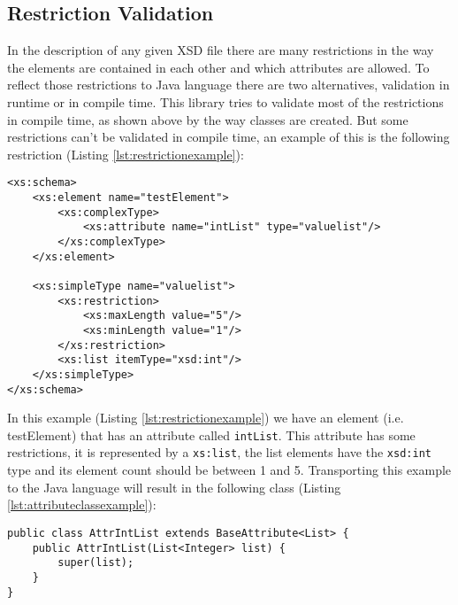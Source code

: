 \subsection{Restriction Validation}
\label{sec:restrictionvalidation}

In the description of any given \ac{XSD} file there are many restrictions in the way the elements are contained in each other and which attributes are allowed. To reflect those restrictions to Java language there are two alternatives, validation in runtime or in compile time. This library tries to validate most of the restrictions in compile time, as shown above by the way classes are created. But some restrictions can't be validated in compile time, an example of this is the following restriction (Listing \ref{lst:restrictionexample}):

\bigskip


\begin{minipage}{\linewidth}
\begin{lstlisting}[caption={Restrictions Example},captionpos=b,label={lst:restrictionexample}]
<xs:schema>
    <xs:element name="testElement">
        <xs:complexType>
            <xs:attribute name="intList" type="valuelist"/>
        </xs:complexType>
    </xs:element>
    
    <xs:simpleType name="valuelist">
        <xs:restriction>
            <xs:maxLength value="5"/>
            <xs:minLength value="1"/>
        </xs:restriction>
        <xs:list itemType="xsd:int"/>
    </xs:simpleType>
</xs:schema>
\end{lstlisting}
\end{minipage}

\noindent
In this example (Listing \ref{lst:restrictionexample}) we have an element (i.e. testElement) that has an attribute called \texttt{intList}. This attribute has some restrictions, it is represented by a \texttt{xs:list}, the list elements have the \texttt{xsd:int} type and its element count should be between 1 and 5. Transporting this example to the Java language will result in the following class (Listing \ref{lst:attributeclassexample}):


\begin{minipage}{\linewidth}
\begin{lstlisting}[caption={Attribute Class Example},captionpos=b,label={lst:attributeclassexample}]
public class AttrIntList extends BaseAttribute<List> {
    public AttrIntList(List<Integer> list) {
        super(list);
    }
}
\end{lstlisting}
\end{minipage}

